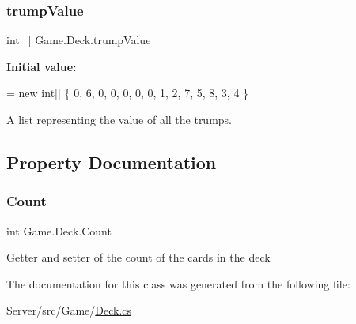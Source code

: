 \subsubsection{\texorpdfstring{trump\+Value}{trumpValue}}
{\footnotesize\ttfamily int \mbox{[}$\,$\mbox{]} Game.\+Deck.\+trump\+Value}

{\bfseries Initial value\+:}
\begin{DoxyCode}
= \textcolor{keyword}{new} \textcolor{keywordtype}{int}[]
       \{
            0, 6, 0, 0, 0, 0, 0, 1, 2, 7, 5, 8, 3, 4
       \}
\end{DoxyCode}
A list representing the value of all the trumps. 

\subsection{Property Documentation}
\mbox{\label{class_game_1_1_deck_a9b8b9e6382eba67dfd83e41134c5a601}} 
\subsubsection{\texorpdfstring{Count}{Count}}
{\footnotesize\ttfamily int Game.\+Deck.\+Count\hspace{0.3cm}{\ttfamily [get]}}

Getter and setter of the count of the cards in the deck 

The documentation for this class was generated from the following file\+:\begin{DoxyCompactItemize}
\item 
Server/src/\+Game/\hyperlink{_deck_8cs}{Deck.\+cs}\end{DoxyCompactItemize}
